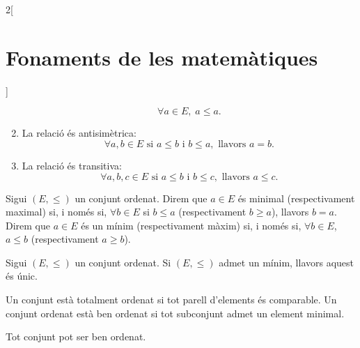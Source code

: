 \documentclass[class=article,10pt,crop=false]{standalone}
\begin{document}
\begin{multicols}{2}[\section{Fonaments de les matemàtiques}]
\begin{definition}
\begin{enumerate}
    $$\forall a\in E,\;a\leq a.$$
    \item La relació és antisimètrica:
    $$\forall a,b\in E\text{ si }a\leq b\text{ i }b\leq a,\text{ llavors }a=b.$$
    \item La relació és transitiva:
    $$\forall a,b,c\in E\text{ si }a\leq b\text{ i }b\leq c,\text{ llavors }a\leq c.$$
\end{enumerate}
\end{definition}
\begin{definition}
Sigui $(E,\leq)$ un conjunt ordenat. Direm que $a\in E$ és minimal (respectivament maximal) si, i només si, $\forall b\in E$ si $b\leq a$ (respectivament $b\geq a$), llavors $b=a$. Direm que $a\in E$ és un mínim (respectivament màxim) si, i només si, $\forall b\in E$, $a\leq b$ (respectivament $a\geq b$).
\end{definition}
\begin{lemma}
Sigui $(E,\leq)$ un conjunt ordenat. Si $(E,\leq)$ admet un mínim, llavors aquest és únic.
\end{lemma}
\begin{definition}
Un conjunt està totalment ordenat si tot parell d'elements és comparable. Un conjunt ordenat està ben ordenat si tot subconjunt admet un element minimal.
\end{definition}
\begin{theorem}
Tot conjunt pot ser ben ordenat.
\end{theorem}

\end{multicols}
\end{document}
